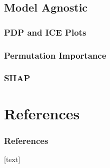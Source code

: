 \documentclass[10pt]{beamer}
\begin{document}
\subsection{Model Agnostic}

\subsubsection{PDP and ICE Plots}

\subsubsection{Permutation Importance}

\subsubsection{SHAP}

\section{References}

\begin{frame}[t, allowframebreaks]
\frametitle{References}
\footnotesize{
[text]

 
}
\end{frame}
\end{document}
